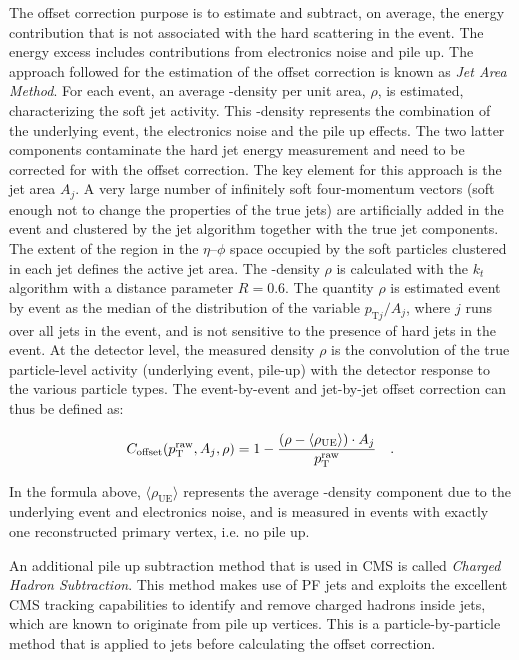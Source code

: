 The offset correction purpose is to estimate and subtract, on average, the energy contribution that is not associated with the hard scattering in the event. The energy excess includes contributions from electronics noise and pile up. The approach followed for the estimation of the offset correction is known as \emph{Jet Area Method}. For each event, an average \pt-density per unit area, $\rho$, is estimated, characterizing the soft jet activity. This \pt-density represents the combination of the underlying event, the electronics noise and the pile up effects. 
The two latter components contaminate the hard jet energy measurement and need to be
corrected for with the offset correction. The key element for this approach is the jet area $A_j$.
A very large number of infinitely soft four-momentum vectors (soft enough not to change the properties of the true jets) are artificially added in the event and clustered by the jet algorithm together with the true jet components. The extent of the region in the $\eta$--$\phi$ space occupied by the soft particles clustered in each jet defines the active jet area. The \pt-density $\rho$ is calculated with the $k_t$ algorithm with a distance parameter $R=0.6$. The quantity $\rho$ is estimated event by event as the median of the distribution of the variable $p_{\mathrm{T}j}/A_j$, where $j$ runs over all jets in the event, and is not sensitive to the presence of hard jets in the event. At the detector level, the measured density $\rho$ is the convolution of the true particle-level activity (underlying event, pile-up) with the detector response to the various particle types. The event-by-event and jet-by-jet offset correction can thus be defined as:

\begin{equation}
C_\mathrm{offset}(p_\mathrm{T}^\mathrm{raw},A_j,\rho) = 1 - \frac{\left( \rho - \langle\rho_\mathrm{UE}\rangle \right)\cdot A_j}{p_\mathrm{T}^\mathrm{raw}}\quad .
\end{equation}

In the formula above, $\langle\rho_\mathrm{UE}\rangle$ represents the average \pt-density component due to the underlying event and electronics noise, and is measured in events with exactly one reconstructed primary vertex, i.e. no pile up.

An additional pile up subtraction method that is used in CMS is called \emph{Charged Hadron Subtraction}. This method makes use of PF jets and exploits the excellent CMS tracking capabilities to identify and remove charged hadrons inside jets, which are known to originate from pile up vertices. This is a particle-by-particle method that is applied to jets before calculating the offset correction.

